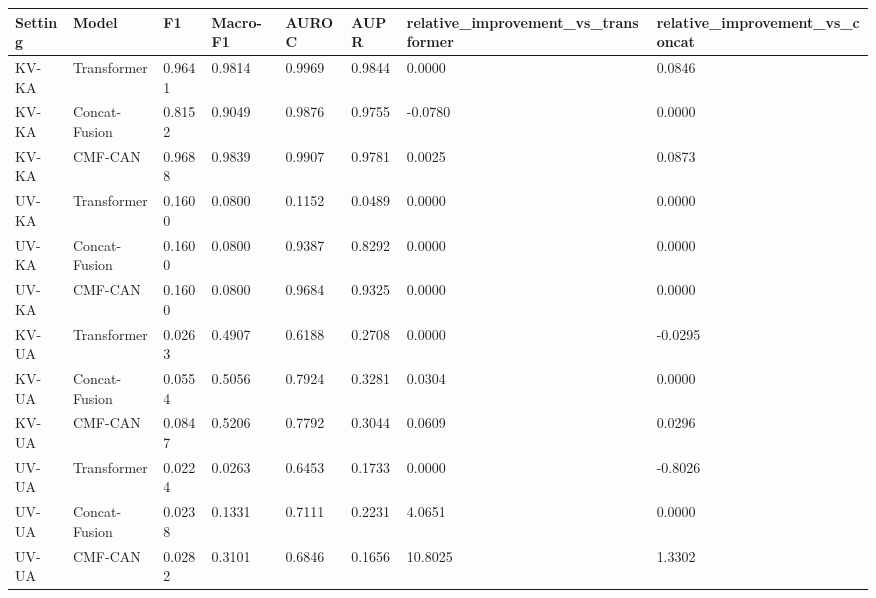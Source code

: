 \begin{tabular}{llllllll}
\toprule
Setting & Model & F1 & Macro-F1 & AUROC & AUPR & relative_improvement_vs_transformer & relative_improvement_vs_concat \\
\midrule
KV-KA & Transformer & 0.9641 & 0.9814 & 0.9969 & 0.9844 & 0.0000 & 0.0846 \\
KV-KA & Concat-Fusion & 0.8152 & 0.9049 & 0.9876 & 0.9755 & -0.0780 & 0.0000 \\
KV-KA & CMF-CAN & 0.9688 & 0.9839 & 0.9907 & 0.9781 & 0.0025 & 0.0873 \\
UV-KA & Transformer & 0.1600 & 0.0800 & 0.1152 & 0.0489 & 0.0000 & 0.0000 \\
UV-KA & Concat-Fusion & 0.1600 & 0.0800 & 0.9387 & 0.8292 & 0.0000 & 0.0000 \\
UV-KA & CMF-CAN & 0.1600 & 0.0800 & 0.9684 & 0.9325 & 0.0000 & 0.0000 \\
KV-UA & Transformer & 0.0263 & 0.4907 & 0.6188 & 0.2708 & 0.0000 & -0.0295 \\
KV-UA & Concat-Fusion & 0.0554 & 0.5056 & 0.7924 & 0.3281 & 0.0304 & 0.0000 \\
KV-UA & CMF-CAN & 0.0847 & 0.5206 & 0.7792 & 0.3044 & 0.0609 & 0.0296 \\
UV-UA & Transformer & 0.0224 & 0.0263 & 0.6453 & 0.1733 & 0.0000 & -0.8026 \\
UV-UA & Concat-Fusion & 0.0238 & 0.1331 & 0.7111 & 0.2231 & 4.0651 & 0.0000 \\
UV-UA & CMF-CAN & 0.0282 & 0.3101 & 0.6846 & 0.1656 & 10.8025 & 1.3302 \\
\bottomrule
\end{tabular}
